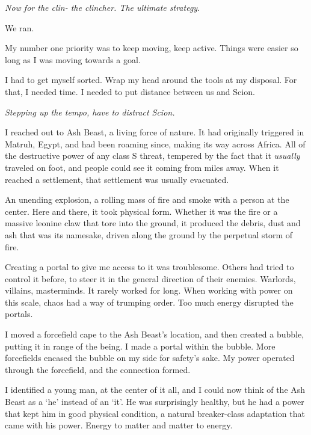 





\emph{Now for the clin- the clincher.  The ultimate strategy}.



We ran.



My number one priority was to keep moving, keep active.  Things were easier so long as I was moving towards a goal.



I had to get myself sorted.  Wrap my head around the tools at my disposal.  For that, I needed time.  I needed to put distance between us and Scion.



\emph{Stepping up the tempo, have to distract Scion.}



I reached out to Ash Beast, a living force of nature.  It had originally triggered in Matruh, Egypt, and had been roaming since, making its way across Africa.  All of the destructive power of any class S threat, tempered by the fact that it \emph{usually} traveled on foot, and people could see it coming from miles away.  When it reached a settlement, that settlement was usually evacuated.



An unending explosion, a rolling mass of fire and smoke with a person at the center.  Here and there, it took physical form.  Whether it was the fire or a massive leonine claw that tore into the ground, it produced the debris, dust and ash that was its namesake, driven along the ground by the perpetual storm of fire.



Creating a portal to give me access to it was troublesome.  Others had tried to control it before, to steer it in the general direction of their enemies.  Warlords, villains, masterminds.  It rarely worked for long.  When working with power on this scale, chaos had a way of trumping order.  Too much energy disrupted the portals.



I moved a forcefield cape to the Ash Beast's location, and then created a bubble, putting it in range of the being.  I made a portal within the bubble.  More forcefields encased the bubble on my side for safety's sake.  My power operated through the forcefield, and the connection formed.



I identified a young man, at the center of it all, and I could now think of the Ash Beast as a `he' instead of an `it'.  He was surprisingly healthy, but he had a power that kept him in good physical condition, a natural breaker-class adaptation that came with his power.  Energy to matter and matter to energy.



